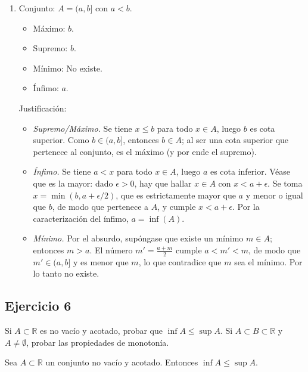 \documentclass[11pt, a4paper]{article}
\begin{document}
\begin{enumerate}
    \item Conjunto: $A = (a, b]$ con $a < b$.
    
    \begin{itemize}
        \item Máximo: $b$.
        \item Supremo: $b$.
        \item Mínimo: No existe.
        \item Ínfimo: $a$.
    \end{itemize}

    Justificación:
    \begin{itemize}
        \item \textit{Supremo/Máximo.} Se tiene $x \le b$ para todo $x \in A$, luego $b$ es cota
        superior. Como $b \in (a, b]$, entonces $b \in A$; al ser una cota superior que pertenece al
        conjunto, es el máximo (y por ende el supremo).

        \item \textit{Ínfimo.} Se tiene $a < x$ para todo $x \in A$, luego $a$ es cota inferior.
        Véase que es la mayor: dado $\epsilon > 0$, hay que hallar $x \in A$ con $x < a + \epsilon$.
        Se toma $x = \min(b, a + \epsilon/2)$, que es estrictamente mayor que $a$ y menor o igual que
        $b$, de modo que pertenece a $A$, y cumple $x < a + \epsilon$. Por la caracterización del ínfimo,
        $a = \inf(A)$.

        \item \textit{Mínimo.} Por el absurdo, supóngase que existe un mínimo $m \in A$; entonces
        $m > a$. El número
        $m' = \frac{a+m}{2}$ cumple $a < m' < m$, de modo que $m' \in (a, b]$ y es menor que $m$, lo que
        contradice que $m$ sea el mínimo. Por lo tanto no existe.
    \end{itemize}
\end{enumerate}

\subsection*{Ejercicio 6}

Si $A \subset \mathbb{R}$ es no vacío y acotado, probar que $\inf A \le \sup A$.
Si $A \subset B \subset \mathbb{R}$ y $A \neq \emptyset$, probar las propiedades de monotonía.

\begin{proposicion}{}{}
Sea $A \subset \mathbb{R}$ un conjunto no vacío y acotado. Entonces $\inf A \le \sup A$.
\end{proposicion}
\end{document}
